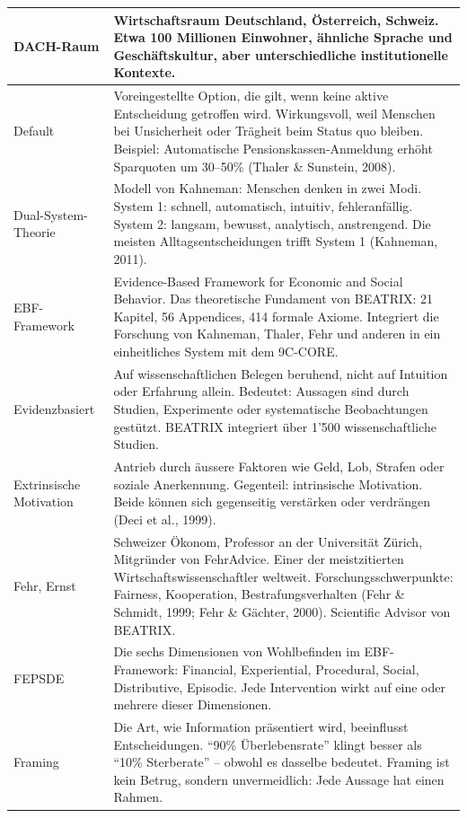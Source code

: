 \documentclass[11pt,a4paper]{article}
\begin{document}
\begin{longtable}{@{}L{4cm}L{10cm}@{}}
\midrule
DACH-Raum & Wirtschaftsraum Deutschland, Österreich, Schweiz. Etwa 100 Millionen Einwohner, ähnliche Sprache und Geschäftskultur, aber unterschiedliche institutionelle Kontexte. \\
\midrule
Default & Voreingestellte Option, die gilt, wenn keine aktive Entscheidung getroffen wird. Wirkungsvoll, weil Menschen bei Unsicherheit oder Trägheit beim Status quo bleiben. Beispiel: Automatische Pensionskassen-Anmeldung erhöht Sparquoten um 30--50\% (Thaler \& Sunstein, 2008). \\
\midrule
Dual-System-Theorie & Modell von Kahneman: Menschen denken in zwei Modi. System 1: schnell, automatisch, intuitiv, fehleranfällig. System 2: langsam, bewusst, analytisch, anstrengend. Die meisten Alltagsentscheidungen trifft System 1 (Kahneman, 2011). \\
\midrule
EBF-Framework & Evidence-Based Framework for Economic and Social Behavior. Das theoretische Fundament von BEATRIX: 21 Kapitel, 56 Appendices, 414 formale Axiome. Integriert die Forschung von Kahneman, Thaler, Fehr und anderen in ein einheitliches System mit dem 9C-CORE. \\
\midrule
Evidenzbasiert & Auf wissenschaftlichen Belegen beruhend, nicht auf Intuition oder Erfahrung allein. Bedeutet: Aussagen sind durch Studien, Experimente oder systematische Beobachtungen gestützt. BEATRIX integriert über 1'500 wissenschaftliche Studien. \\
\midrule
Extrinsische Motivation & Antrieb durch äussere Faktoren wie Geld, Lob, Strafen oder soziale Anerkennung. Gegenteil: intrinsische Motivation. Beide können sich gegenseitig verstärken oder verdrängen (Deci et al., 1999). \\
\midrule
Fehr, Ernst & Schweizer Ökonom, Professor an der Universität Zürich, Mitgründer von FehrAdvice. Einer der meistzitierten Wirtschaftswissenschaftler weltweit. Forschungsschwerpunkte: Fairness, Kooperation, Bestrafungsverhalten (Fehr \& Schmidt, 1999; Fehr \& Gächter, 2000). Scientific Advisor von BEATRIX. \\
\midrule
FEPSDE & Die sechs Dimensionen von Wohlbefinden im EBF-Framework: Financial, Experiential, Procedural, Social, Distributive, Episodic. Jede Intervention wirkt auf eine oder mehrere dieser Dimensionen. \\
\midrule
Framing & Die Art, wie Information präsentiert wird, beeinflusst Entscheidungen. ``90\% Überlebensrate'' klingt besser als ``10\% Sterberate'' -- obwohl es dasselbe bedeutet. Framing ist kein Betrug, sondern unvermeidlich: Jede Aussage hat einen Rahmen. \\

\end{longtable}
\end{document}

